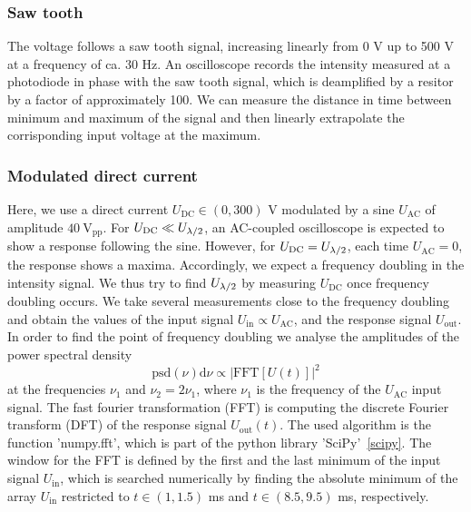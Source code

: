 \subsubsection{Saw tooth}
The voltage follows a saw tooth signal, increasing linearly from 0 V up to 500 V 
at a frequency of ca. 30 Hz. An oscilloscope records the intensity measured 
at a photodiode in phase with the saw tooth signal, which is deamplified 
by a resitor by a factor of approximately 100. 
We can measure the distance in time between minimum and maximum of the signal 
and then linearly extrapolate the corrisponding input voltage at the maximum.
\subsubsection{Modulated direct current}
Here, we use a direct current $U_\mathrm{DC} \in (0, 300)$ V modulated by a 
sine $U_\mathrm{AC}$ of amplitude $40 \ \mathrm{V_{pp}}$. 
For $U_\mathrm{DC} \ll U_{\lambda/2}$, an AC-coupled 
oscilloscope is expected to show a response following the sine. However, for 
$U_\mathrm{DC} = U_{\lambda/2}$, each time $U_\mathrm{AC} = 0$, the response shows a maxima. 
Accordingly, we expect a frequency doubling in the intensity signal. 
We thus try to find $U_{\lambda/2}$ by measuring $U_\mathrm{DC}$ once 
frequency doubling occurs. 
We take several measurements close to the frequency doubling
and obtain the values of the input signal 
$U_\mathrm{in} \propto U_\mathrm{AC}$, 
and the response signal $U_\mathrm{out}$. 
In order to find the point of frequency doubling we analyse 
the amplitudes of the power spectral density 
\begin{equation}
    \mathrm{psd}(\nu) \mathrm{d}\nu \propto |\mathrm{FFT}[U(t)]|^2
\end{equation}
at the frequencies 
$\nu_1$ and $\nu_2 = 2\nu_1$, where $\nu_1$ is the frequency 
of the $U_\mathrm{AC}$ input signal. 
The fast fourier transformation (FFT) is computing the discrete 
Fourier transform (DFT) of the response signal $U_\mathrm{out}(t)$. 
The used algorithm is the function 'numpy.fft',
which is part of the python library 'SciPy'~\ref{scipy}. 
The window for the FFT is defined by the first and the last minimum 
of the input signal $U_\mathrm{in}$, 
which is searched numerically by finding the absolute minimum of the array 
$U_\mathrm{in}$ restricted to $t \in (1, 1.5)$ ms and $t \in (8.5, 9.5)$ ms, 
respectively. 



